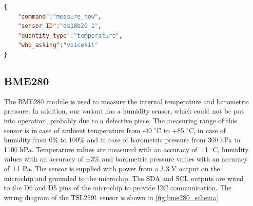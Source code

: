 \begin{itemize}
\begin{lstlisting}[language=json,firstnumber=1,caption={Structure of JSON message to command sensor to measure current data in module \textit{Sensors}},captionpos=b,xleftmargin=1cm]
{
    "command":"measure_now",
    "sensor_ID":"ds18b20_1",
    "quantity_type":"temperature",
    "who_asking":"voicekit"
}
    \end{lstlisting}
\end{itemize}


\subsection{BME280}

The BME280 \citep{BME280_Datasheet} module is used to measure the internal temperature and barometric pressure. In addition, our variant has a humidity sensor, which could not be put into operation, probably due to a defective piece. The measuring range of this sensor is in case of ambient temperature from -40 $^{\circ}$C to +85 $^{\circ}$C, in case of humidity from 0$\%$ to 100$\%$ and in case of barometric pressure from 300 hPa to 1100 hPa. Temperature values are measured with an accuracy of ±1 $^{\circ}$C, humidity values with an accuracy of ±3$\%$ and barometric pressure values with an accuracy of ±1 Pa. The sensor is supplied with power from a 3.3 V output on the microchip and grounded to the microchip. The SDA and SCL outputs are wired to the D6 and D5 pins of the microchip to provide I2C communication. The wiring diagram of the TSL2591 sensor is shown in \cref{fig:bme280_schema}

